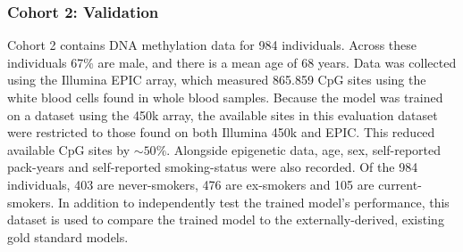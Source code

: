 \documentclass{article}
\begin{document}

\subsubsection{Cohort 2: Validation}
Cohort 2 contains DNA methylation data for 984 individuals. Across these individuals 67\% are male, and there is a mean age of 68 years. Data was collected using the Illumina EPIC array, which measured \num{865,859} CpG sites using the white blood cells found in whole blood samples. Because the model was trained on a dataset using the 450k array, the available sites in this evaluation dataset were restricted to those found on both Illumina 450k and EPIC. This reduced available CpG sites by \(\sim\!50\%\). Alongside epigenetic data, age, sex, self-reported pack-years and self-reported smoking-status were also recorded. Of the 984 individuals, 403 are never-smokers, 476 are ex-smokers and 105 are current-smokers. In addition to independently test the trained model's performance, this dataset is used to compare the trained model to the externally-derived, existing gold standard models.

\end{document}
